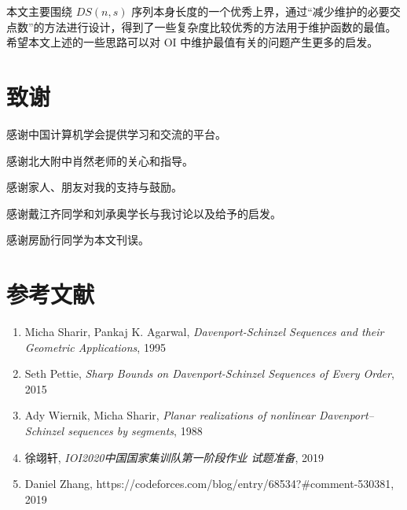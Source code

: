 \documentclass{noithesis}
\begin{document}
本文主要围绕 $DS(n,s)$ 序列本身长度的一个优秀上界，通过“减少维护的必要交点数”的方法进行设计，得到了一些复杂度比较优秀的方法用于维护函数的最值。希望本文上述的一些思路可以对 OI 中维护最值有关的问题产生更多的启发。

\section*{致谢}

感谢中国计算机学会提供学习和交流的平台。

感谢北大附中肖然老师的关心和指导。

感谢家人、朋友对我的支持与鼓励。

感谢戴江齐同学和刘承奥学长与我讨论以及给予的启发。

感谢房励行同学为本文刊误。

\section*{参考文献}
\begin{enumerate}[\lbrack 1\rbrack]
\item Micha Sharir, Pankaj K. Agarwal, \emph{Davenport-Schinzel Sequences and their Geometric Applications}, 1995
\item Seth Pettie, \emph{Sharp Bounds on Davenport-Schinzel Sequences of Every Order}, 2015
\item Ady Wiernik, Micha Sharir, \emph{Planar realizations of nonlinear Davenport–Schinzel sequences by segments}, 1988
\item 徐翊轩, \emph{IOI2020中国国家集训队第一阶段作业 试题准备}, 2019
\item Daniel Zhang, https://codeforces.com/blog/entry/68534?\#comment-530381, 2019
\end{enumerate}


\end{document}
